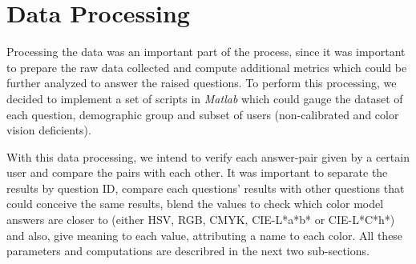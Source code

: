 \section{Data Processing}
\label{sec:results_digest}
%
Processing the data was an important part of the process, since it was important to prepare the raw data collected and compute additional metrics which could be further
analyzed to answer the raised questions. To perform this processing, we decided to implement a set of scripts in \emph{Matlab} which could gauge the dataset of each question,
demographic group and subset of users (non-calibrated and color vision deficients). \par
%
With this data processing, we intend to verify each answer-pair given by a certain user and compare the pairs with each other. It was important to separate the results by question
ID, compare each questions' results with other questions that could conceive the same results, blend the values to check which color model answers are closer to (either \gls{HSV}, \gls{RGB},
\gls{CMYK}, CIE-L*a*b* or CIE-L*C*h*) and also, give meaning to each value, attributing a name to each color. All these parameters and computations are describred in the next two
sub-sections. \par
%
%
